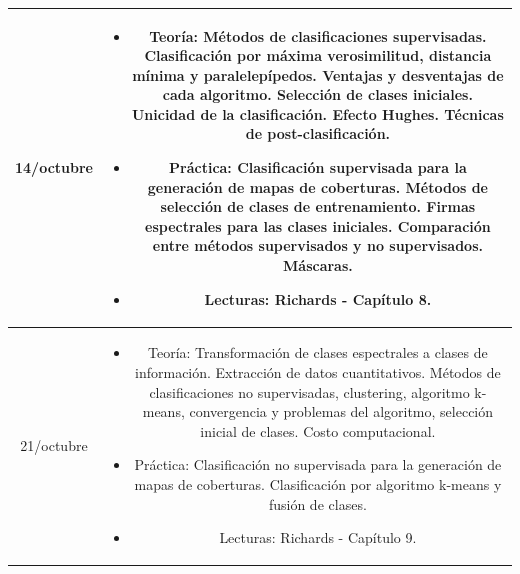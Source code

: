 \documentclass[11pt]{article}
\begin{document}
\begin{longtable}[h!]{| c | c | }
\midrule
14/octubre & \begin{minipage}{.65\textwidth}
\begin{itemize} 
    \vspace{1mm}
	\item Teoría: Métodos de clasificaciones supervisadas. Clasificación por máxima verosimilitud, distancia mínima y paralelepípedos. Ventajas y desventajas de cada algoritmo. Selección de clases iniciales. Unicidad de la clasificación. Efecto Hughes. Técnicas de post-clasificación.
	\item Práctica: Clasificación supervisada para la generación de mapas de coberturas. Métodos de selección de clases de entrenamiento. Firmas espectrales para las clases iniciales. Comparación entre métodos supervisados y no supervisados. Máscaras.
	\item Lecturas: Richards - Capítulo 8.
    \vspace{1mm}
\end{itemize}
\end{minipage} \\

\midrule
21/octubre & \begin{minipage}{.65\textwidth}
\begin{itemize}
    \vspace{1mm}
	\item Teoría: Transformación de clases espectrales a clases de información. Extracción de datos cuantitativos. Métodos de clasificaciones no supervisadas, clustering, algoritmo k-means, convergencia y problemas del algoritmo, selección inicial de clases. Costo computacional.
  \item Práctica: Clasificación no supervisada para la generación de mapas de coberturas. Clasificación por algoritmo k-means y fusión de clases.
	\item Lecturas: Richards - Capítulo 9.
    \vspace{1mm}
\end{itemize}
\end{minipage} \\


\end{longtable}
\end{document}
